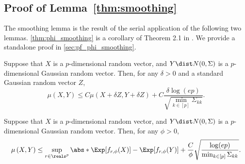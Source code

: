 \documentclass[aos]{imsart}
\begin{document}
\begin{appendix}



\subsection{Proof of Lemma~\ref{thm:smoothing}} \label{sec:pf_smoothing} 

The smoothing lemma is the result of the serial application of the following two lemmas. \cref{thm:phi_smoothing} is a corollary of Theorem 2.1 in . We provide a standalone proof in \cref{sec:pf_phi_smoothing}.

\begin{lemma}
\label{thm:G_smoothing}
Suppose that $X$ is a $p$-dimensional random vector, and $Y \dist N(0,\Sigma)$ is a $p$-dimensional Gaussian random vector. Then, for any $\delta > 0$ and a standard Gaussian random vector $Z$, 
\begin{equation*}
    \mu(X, Y) \leq C \mu(X + \delta Z, Y + \delta Z) 
    + C \frac{\delta \log(ep)}{\sqrt{\min_{k \in [p]} \Sigma_{kk}}}.
\end{equation*}
\end{lemma}

\begin{lemma}%
\label{thm:phi_smoothing}
Suppose that $X$ is a $p$-dimensional random vector, and $Y \dist N(0,\Sigma)$ is a $p$-dimensional Gaussian random vector. Then, for any $\phi > 0$, 
\begin{equation*}
\begin{aligned}
    \mu\left(X, Y\right) 
    \leq \sup_{r \in \reals^p} \abs*{ \Exp[f_{r,\phi}(X)] - \Exp[f_{r,\phi}(Y)]}
    + \frac{C}{\phi} \sqrt{\frac{\log(ep)}{\min_{k \in [p]} \Sigma_{kk}}}.
\end{aligned}
\end{equation*}
\end{lemma}


\end{appendix}
\end{document}
